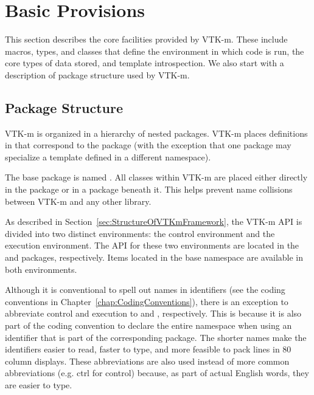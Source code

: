 
\chapter{Basic Provisions}
\label{chap:BasicProvisions}

This section describes the core facilities provided by VTK-m. These include
macros, types, and classes that define the environment in which code is
run, the core types of data stored, and template introspection. We also
start with a description of package structure used by VTK-m.

\section{Package Structure}
\label{sec:PackageStructure}


VTK-m is organized in a hierarchy of nested packages. VTK-m places
definitions in   that correspond to
the package (with the exception that one package may specialize a template
defined in a different namespace).

The base package is named \vtkm{}. All classes within VTK-m are placed
either directly in the \vtkm{} package or in a package beneath it. This
helps prevent name collisions between VTK-m and any other library.

As described in Section~\ref{sec:StructureOfVTKmFramework}, the VTK-m API
is divided into two distinct environments:  the control
environment  and the execution
environment.  The API for these two
environments are located in the \vtkmcont{} and \vtkmexec{} packages,
respectively. Items located in the base \vtkm{} namespace are available in
both environments.

Although it is conventional to spell out names in identifiers (see the
coding conventions in Chapter~\ref{chap:CodingConventions}), there is an
exception to abbreviate control and execution to 
and , respectively. This is because it is also part of
the coding convention to declare the entire namespace when using an
identifier that is part of the corresponding package. The shorter names
make the identifiers easier to read, faster to type, and more feasible to
pack lines in 80 column displays. These abbreviations are also used instead
of more common abbreviations (e.g. ctrl for control) because, as part of
actual English words, they are easier to type.

